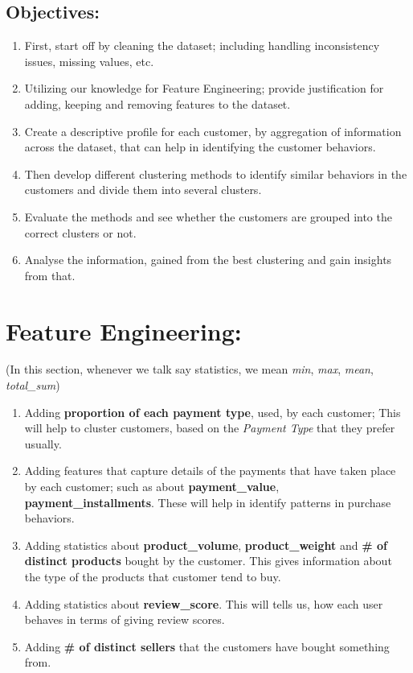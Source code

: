 \documentclass[a4paper,12pt]{article}
\begin{document}
\subsection{Objectives:} 
\begin{enumerate}
    \item First, start off by cleaning the dataset; including handling inconsistency issues, missing values, etc.
    \item Utilizing our knowledge for Feature Engineering; provide justification for adding, keeping and removing features to the dataset.  
    \item Create a descriptive profile for each customer, by aggregation of information across the dataset, that can help in identifying the customer behaviors.
    \item Then develop different clustering methods to identify similar behaviors in the customers and divide them into several clusters.
    \item Evaluate the methods and see whether the customers are grouped into the correct clusters or not.
    \item Analyse the information, gained from the best clustering and gain insights from that.
\end{enumerate}


\section{Feature Engineering:}
(In this section, whenever we talk say statistics, we mean \textit{min}, \textit{max}, \textit{mean}, \textit{total\_sum})
\begin{enumerate}
    \item Adding \textbf{proportion of each payment type}, used, by each customer; This will help to cluster customers, based on the \textit{Payment Type} that they prefer usually.
    \item Adding features that capture details of the payments that have taken place by each customer; such as about \textbf{payment\_value}, \textbf{payment\_installments}. These will help in identify patterns in purchase behaviors.
    \item Adding statistics about \textbf{product\_volume}, \textbf{product\_weight} and \textbf{\# of distinct products} bought by the customer. This gives information about the type of the products that customer tend to buy.
    \item Adding statistics about \textbf{review\_score}. This will tells us, how each user behaves in terms of giving review scores.
    \item Adding \textbf{\# of distinct sellers} that the customers have bought something from. 
\end{enumerate}
\end{document}
